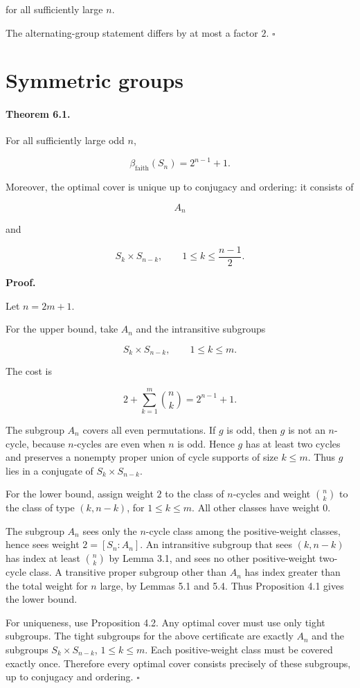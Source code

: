 \documentclass[11pt]{article}
\begin{document}
for all sufficiently large $n$.

The alternating-group statement differs by at most a factor $2$. $\square$

\section{Symmetric groups}

\paragraph{Theorem 6.1.}

For all sufficiently large odd $n$,

\[
\beta_{\mathrm{faith}}(S_n)=2^{n-1}+1.
\]

Moreover, the optimal cover is unique up to conjugacy and ordering: it consists of

\[
A_n
\]

and

\[
S_k\times S_{n-k},
\qquad
1\le k\le \frac{n-1}{2}.
\]

\noindent\textbf{Proof.}

Let $n=2m+1$.

For the upper bound, take $A_n$ and the intransitive subgroups

\[
S_k\times S_{n-k},
\qquad
1\le k\le m.
\]

The cost is

\[
2+\sum_{k=1}^m\binom nk
=
2^{n-1}+1.
\]

The subgroup $A_n$ covers all even permutations. If $g$ is odd, then $g$ is not an $n$-cycle, because $n$-cycles are even when $n$ is odd. Hence $g$ has at least two cycles and preserves a nonempty proper union of cycle supports of size $k\le m$. Thus $g$ lies in a conjugate of $S_k\times S_{n-k}$.

For the lower bound, assign weight $2$ to the class of $n$-cycles and weight $\binom nk$ to the class of type $(k,n-k)$, for $1\le k\le m$. All other classes have weight $0$.

The subgroup $A_n$ sees only the $n$-cycle class among the positive-weight classes, hence sees weight $2=[S_n:A_n]$. An intransitive subgroup that sees $(k,n-k)$ has index at least $\binom nk$ by Lemma 3.1, and sees no other positive-weight two-cycle class. A transitive proper subgroup other than $A_n$ has index greater than the total weight for $n$ large, by Lemmas 5.1 and 5.4. Thus Proposition 4.1 gives the lower bound.

For uniqueness, use Proposition 4.2. Any optimal cover must use only tight subgroups. The tight subgroups for the above certificate are exactly $A_n$ and the subgroups $S_k\times S_{n-k}$, $1\le k\le m$. Each positive-weight class must be covered exactly once. Therefore every optimal cover consists precisely of these subgroups, up to conjugacy and ordering. $\square$
\end{document}
